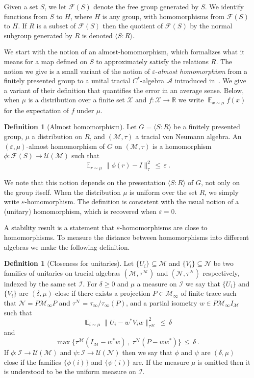 \documentclass[11pt]{article}
\theoremstyle{definition}
\newtheorem{definition}[theorem]{Definition}
\newcommand{\Id}{\ensuremath{I}}
\DeclareMathOperator*{\Expectation}{\mathbb{E}}
\newcommand{\Es}[1]{\Expectation_{#1}}
\newcommand{\R}{\ensuremath{\mathbb{R}}}
\newcommand{\mA}{\ensuremath{\mathcal{A}}}
\newcommand{\mF}{\ensuremath{\mathcal{F}}}
\newcommand{\mM}{\ensuremath{\mathcal{M}}}
\newcommand{\mI}{\ensuremath{\mathcal{I}}}
\newcommand{\mU}{\ensuremath{\mathcal{U}}}
\newcommand{\mX}{\ensuremath{\mathcal{X}}}
\newcommand{\eps}{\varepsilon}
\newcommand{\mN}{\mathcal{N}}
\begin{document}
Given a set $S$, we let $\mF(S)$ denote the free group generated by $S$. We identify functions from $S$ to $H$, where $H$ is any group, with homomorphisms from $\mF(S)$ to $H$. If $R$ is a subset of $\mF(S)$ then the quotient of $\mF(S)$ by the normal subgroup generated by $R$ is denoted $\langle S:R\rangle$. 

We start with the notion of an almost-homomorphism, which formalizes what it means for a map defined on $S$ to approximately satisfy the relations $R$. The notion we give is a small variant of the notion of $\eps$-\emph{almost homomorphism} from a finitely presented group to a unital tracial $C^*$-algebra $\mA$ introduced in~\cite[Section 2]{hadwin2018stability}. %
We give a variant of their definition that quantifies the error in an average sense. Below, when $\mu$ is a distribution over a finite set $\mX$ and $f:\mX\to \R$ we write $\Es{x\sim \mu} f(x)$ for the expectation of $f$ under $\mu$. 

\begin{definition}[Almost homomorphism]\label{def:approx-hom}
Let $G = \langle S:R\rangle $ be a finitely presented group, $\mu$ a distribution on $R$, and $(\mM,\tau)$ a tracial von Neumann algebra. An $(\eps,\mu)$-almost homomorphism of $G$ on $(\mM,\tau)$ is a homomorphism $\phi:\mF(S)\to\mU(\mM)$ such that
\[ \Es{r\sim \mu} \big\|  \phi(r) - \Id \big \|_\tau^2 \,\leq\, \eps\;.\]
\end{definition}

We note that this notion depends on the presentation $\langle S:R\rangle$ of $G$, not only on the group itself. 
When the distribution $\mu$ is uniform over the set $R$, we simply write $\eps$-homomorphism. The definition is consistent with the usual notion of a (unitary) homomorphism, which is recovered when $\eps=0$. 

A stability result is a statement that $\eps$-homomorphisms are close to homomorphisms. To measure the distance between homomorphisms into different algebras we make the following definition. 


\begin{definition}[Closeness for unitaries]\label{def:close}
Let $\{U_i\}\subseteq \mM$ and $\{V_i\}\subseteq \mN$ be two families of unitaries on  tracial algebras $(\mM,\tau^\mM)$ and $(\mN,\tau^\mN)$ respectively, indexed by the same set $\mI$. For $\delta\geq0$ and $\mu$ a measure on $\mI$ we say that $\{U_i\}$ and $\{V_i\}$ are $(\delta,\mu)$-close if there exists a projection $P\in\mM_\infty$ of finite trace such that $\mN=P\mM_\infty P$ and $\tau^\mN=\tau_\infty/\tau_\infty(P)$, and a partial isometry $w\in P \mM_\infty \Id_\mM$ such that 
\[ \Es{i\sim\mu} \big\| U_i - w^* V_i w \big\|_{\tau^\mM}^2 \,\leq\,\delta\]
and 
\[\max\big\{ \tau^\mM(\Id_\mM-w^*w)\,,\; \tau^\mN(P-ww^*)\big\} \,\leq\, \delta\;.\]
If $\phi:\mI\to \mU(\mM)$ and $\psi:\mI\to \mU(\mN)$ then we say that $\phi$ and $\psi$ are $(\delta,\mu)$ close if the families $\{\phi(i)\}$ and $\{\psi(i)\}$ are. 
If the measure $\mu$ is omitted then it is understood to be the uniform measure on $\mI$.
\end{definition}
\end{document}
